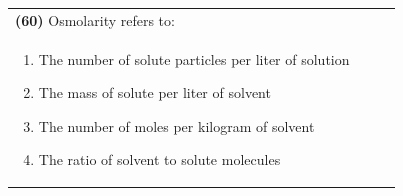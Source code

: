 \documentclass{article}
\begin{document}
\noindent\begin{tabular}{|p{0.9\linewidth}|}
\hline
\textbf{(60)} Osmolarity refers to:\\[0.2cm]
\begin{minipage}[t]{0.85\linewidth}
\begin{enumerate}[label=\alph*.]
\item The number of solute particles per liter of solution
\item The mass of solute per liter of solvent
\item The number of moles per kilogram of solvent
\item The ratio of solvent to solute molecules
\end{enumerate}
\end{minipage}\\[0.2cm]
\hline
\end{tabular}
\end{document}
